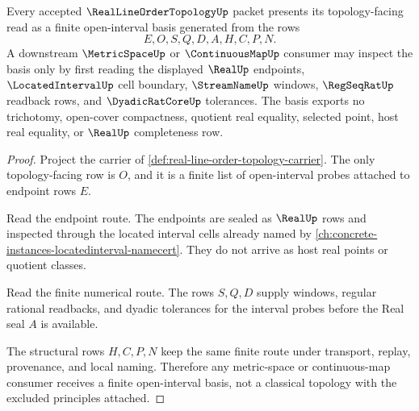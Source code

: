 \begin{theorem}
\label{thm:real-line-order-topology-open-interval-basis}
Every accepted $\RealLineOrderTopologyUp$ packet presents its topology-facing read as a finite open-interval basis generated from the rows
$$
E,O,S,Q,D,A,H,C,P,N .
$$
A downstream $\MetricSpaceUp$ or $\ContinuousMapUp$ consumer may inspect the basis only by first reading the displayed $\RealUp$ endpoints, $\LocatedIntervalUp$ cell boundary, $\StreamNameUp$ windows, $\RegSeqRatUp$ readback rows, and $\DyadicRatCoreUp$ tolerances. The basis exports no trichotomy, open-cover compactness, quotient real equality, selected point, host real equality, or $\RealUp$ completeness row.
\end{theorem}
\begin{proof}
Project the carrier of \autoref{def:real-line-order-topology-carrier}. The only topology-facing row is $O$, and it is a finite list of open-interval probes attached to endpoint rows $E$.

Read the endpoint route. The endpoints are sealed as $\RealUp$ rows and inspected through the located interval cells already named by \autoref{ch:concrete-instances-locatedinterval-namecert}. They do not arrive as host real points or quotient classes.

Read the finite numerical route. The rows $S,Q,D$ supply windows, regular rational readbacks, and dyadic tolerances for the interval probes before the Real seal $A$ is available.

The structural rows $H,C,P,N$ keep the same finite route under transport, replay, provenance, and local naming. Therefore any metric-space or continuous-map consumer receives a finite open-interval basis, not a classical topology with the excluded principles attached.
\end{proof}

